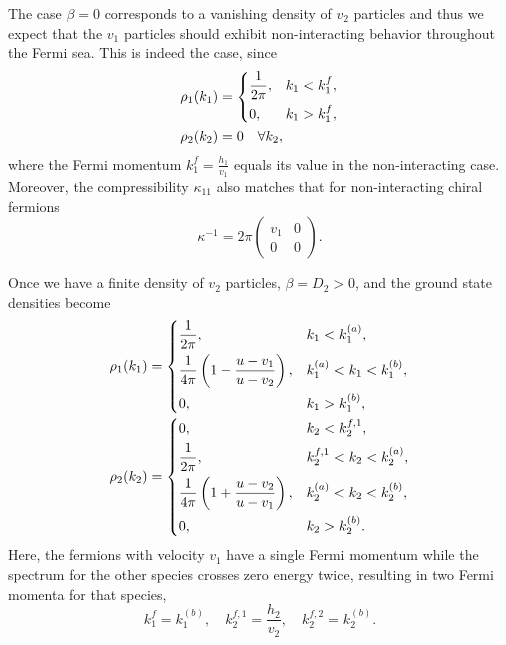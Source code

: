 \documentclass[aps,pra,
superscriptaddress,
reprint,twocolumn,preprintnumbers,
amsmath,amssymb,
nofootinbib]{revtex4-1}
\newcommand{\beq}{\begin{equation}}
\newcommand{\eeq}{\end{equation}}
\begin{document}
The case $\beta = 0$ corresponds to a vanishing density of $v_2$ particles and thus we expect that the $v_1$ particles should exhibit non-interacting behavior throughout the Fermi sea. This is indeed the case, since 
        \begin{align}
        &\rho_1(k_1) = 
        \begin{dcases}
        \frac{1}{2\pi}, &k_1<k_1^f, \\
        0, &k_1>k_1^f,
        \end{dcases} \nonumber\\
        &\rho_2(k_2) = 
        \begin{aligned}
        0 \quad \forall k_2,
        \end{aligned}
        \end{align}
where the Fermi momentum $k_1^f = \frac{h_1}{v_1}$ equals its value in the non-interacting case. Moreover, the compressibility $\kappa_{11}$ also matches that for non-interacting chiral fermions
        \begin{equation}
        \kappa^{-1} = 2 \pi \left(
        \begin{array}{cc}
        v_1 & 0\\
        0 & 0
        \end{array} \right).
        \end{equation}
                    
Once we have a finite density of $v_2$ particles, $\beta = D_2 >0$, and the ground state densities become 
        \begin{align}
        &\rho_1(k_1) = 
        \begin{dcases}
        \frac{1}{2\pi}, &k_1<k_1^{(a)}, \\
        \frac{1}{4\pi} \left(1 - \frac{u - v_1}{u - v_2} \right), &k_1^{(a)}<k_1<k_1^{(b)},\\
        0, &k_1>k_1^{(b)},
        \end{dcases} \nonumber\\
        &\rho_2(k_2) = 
        \begin{dcases}
        0, &k_2<k_2^{f,1},\\
        \frac{1}{2\pi}, &k_2^{f,1}<k_2<k_2^{(a)}, \\
        \frac{1}{4\pi} \left(1 + \frac{u - v_2}{u - v_1} \right), &k_2^{(a)}<k_2<k_2^{(b)},\\
        0, &k_2>k_2^{(b)}.
        \end{dcases}
        \end{align}
Here, the fermions with velocity $v_1$ have a single Fermi momentum while the spectrum for the other species crosses zero energy twice, resulting in two Fermi momenta for that species,
		\beq
		k_1^f = k_1^{(b)},\quad k_2^{f,1} = \frac{h_2}{v_2},\quad k_2^{f,2} = k_2^{(b)}.
		\eeq        
        
\end{document}

